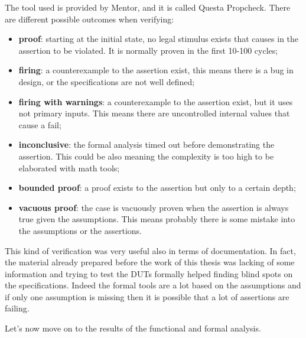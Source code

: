 The tool used is provided by Mentor, and it is called Questa Propcheck.
There are different possible outcomes when verifying:
\begin{itemize}
    \item \textbf{proof}: starting at the initial state, no legal stimulus exists that causes in the assertion to be violated. It is normally proven in the first 10-100 cycles;
    
    \item \textbf{firing}: a counterexample to the assertion exist, this means there is a bug in design, or the specifications are not well defined;
    
    \item \textbf{firing with warnings}: a counterexample to the assertion exist, but it uses not primary inputs. This means there are uncontrolled internal values that cause a fail;
    
    \item \textbf{inconclusive}: the formal analysis timed out before demonstrating the assertion. This could be also meaning the complexity is too high to be elaborated with math tools; 
    
    \item \textbf{bounded proof}: a proof exists to the assertion but only to a certain depth;
    
    \item \textbf{vacuous proof}: the case is vacuously proven when the assertion is always true given the assumptions. This means probably there is some mistake into the assumptions or the assertions.
\end{itemize}


This kind of verification was very useful also in terms of documentation. In fact, the material already prepared before the work of this thesis was lacking of some information and trying to test the DUTs formally helped finding blind spots on the specifications.
Indeed the formal tools are a lot based on the assumptions and if only one assumption is missing then it is possible that a lot of assertions are failing.

Let's now move on to the results of the functional and formal analysis.
